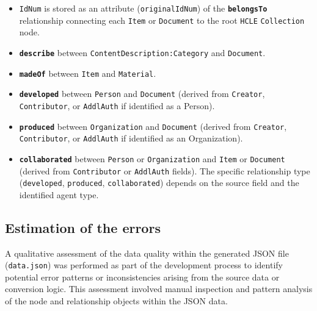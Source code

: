 \begin{itemize}
    \item \texttt{IdNum} is stored as an attribute (\texttt{originalIdNum}) of the \textbf{\texttt{belongsTo}} relationship connecting each \texttt{Item} or \texttt{Document} to the root \texttt{HCLE} \texttt{Collection} node.
    \item \textbf{\texttt{describe}} between \texttt{ContentDescription:Category} and \texttt{Document}.
    \item \textbf{\texttt{madeOf}} between \texttt{Item} and \texttt{Material}.
    \item \textbf{\texttt{developed}} between \texttt{Person} and \texttt{Document} (derived from \texttt{Creator}, \texttt{Contributor}, or \texttt{AddlAuth} if identified as a Person).
    \item \textbf{\texttt{produced}} between \texttt{Organization} and \texttt{Document} (derived from \texttt{Creator}, \texttt{Contributor}, or \texttt{AddlAuth} if identified as an Organization).
    \item \textbf{\texttt{collaborated}} between \texttt{Person} or \texttt{Organization} and \texttt{Item} or \texttt{Document} (derived from \texttt{Contributor} or \texttt{AddlAuth} fields). The specific relationship type (\texttt{developed}, \texttt{produced}, \texttt{collaborated}) depends on the source field and the identified agent type.
\end{itemize}

\subsection{Estimation of the errors}
A qualitative assessment of the data quality within the generated JSON file (\texttt{data.json}) was performed as part of the development process to identify potential error patterns or inconsistencies arising from the source data or conversion logic.
\newline
This assessment involved manual inspection and pattern analysis of the node and relationship objects within the JSON data.

